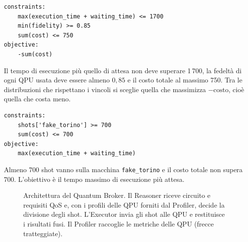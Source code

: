 \begin{esempio}
\begin{verbatim}
constraints:
    max(execution_time + waiting_time) <= 1700
    min(fidelity) >= 0.85
    sum(cost) <= 750
objective:
    -sum(cost)
\end{verbatim}
Il tempo di esecuzione più quello di attesa non deve superare 1\,700, la fedeltà di ogni QPU usata deve essere almeno
$0{,}85$ e il costo totale al massimo 750. Tra le distribuzioni che rispettano i vincoli si sceglie quella che
massimizza $-\text{costo}$, cioè quella che costa meno.
\begin{verbatim}
constraints:
    shots['fake_torino'] >= 700
    sum(cost) <= 700
objective:
    max(execution_time + waiting_time)
\end{verbatim}
Almeno 700 shot vanno sulla macchina \texttt{fake\_torino} e il costo totale non supera 700. L'obiettivo è il tempo
massimo di esecuzione più attesa.
\end{esempio}

\begin{figure}[ht]
\centering
{}
\caption{Architettura del Quantum Broker. Il Reasoner riceve circuito e requisiti QoS e, con i profili delle QPU
forniti dal Profiler, decide la divisione degli shot. L'Executor invia gli shot alle QPU e restituisce i risultati fusi.
Il Profiler raccoglie le metriche delle QPU (frecce tratteggiate).}
\label{fig:qse-broker}
\end{figure}

